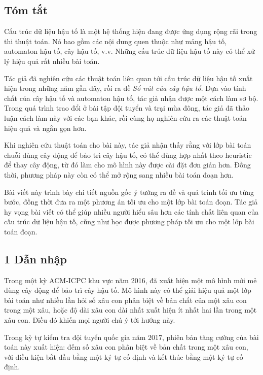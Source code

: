 \documentclass[11pt]{article}
\begin{document}
\subsection*{Tóm tắt}

Cấu trúc dữ liệu hậu tố là một hệ thống hiện đang được ứng dụng rộng rãi trong
thi thuật toán. Nó bao gồm các nội dung quen thuộc như mảng hậu tố, automaton
hậu tố, cây hậu tố, v.v. Những cấu trúc dữ liệu hậu tố này có thể xử lý hiệu quả
rất nhiều bài toán.

Tác giả đã nghiên cứu các thuật toán liên quan tới cấu trúc dữ liệu hậu tố xuất
hiện trong những năm gần đây, rồi ra đề \emph{Số nút của cây hậu tố}. Dựa vào
tính chất của cây hậu tố và automaton hậu tố, tác giả nhận được một cách làm
sơ bộ. Trong quá trình trao đổi ở bài tập đội tuyển và trại mùa đông, tác giả
đã thảo luận cách làm này với các bạn khác, rồi cùng họ nghiên cứu ra các thuật
toán hiệu quả và ngắn gọn hơn.

Khi nghiên cứu thuật toán cho bài này, tác giả nhận thấy rằng với lớp bài toán
chuỗi dùng cây động để bảo trì cây hậu tố, có thể dùng hợp nhất theo heuristic
để thay cây động, từ đó làm cho mô hình này được cài đặt đơn giản hơn. Đồng
thời, phương pháp này còn có thể mở rộng sang nhiều bài toán đoạn hơn.

Bài viết này trình bày chi tiết nguồn gốc ý tưởng ra đề và quá trình tối ưu
từng bước, đồng thời đưa ra một phương án tối ưu cho một lớp bài toán đoạn. Tác
giả hy vọng bài viết có thể giúp nhiều người hiểu sâu hơn các tính chất liên
quan của cấu trúc dữ liệu hậu tố, cũng như học được phương pháp tối ưu cho một
lớp bài toán đoạn.

\subsection*{1 Dẫn nhập}

Trong một kỳ ACM-ICPC khu vực năm 2016, đã xuất hiện một mô hình mới mẻ dùng
cây động để bảo trì cây hậu tố. Mô hình này có thể giải hiệu quả một lớp bài
toán như nhiều lần hỏi số xâu con phân biệt về bản chất của một xâu con trong
một xâu, hoặc độ dài xâu con dài nhất xuất hiện ít nhất hai lần trong một xâu
con. Điều đó khiến mọi người chú ý tới hướng này.

Trong kỳ tự kiểm tra đội tuyển quốc gia năm 2017, phiên bản tăng cường của bài
toán này xuất hiện: đếm số xâu con phân biệt về bản chất trong một xâu con, với
điều kiện bắt đầu bằng một ký tự cố định và kết thúc bằng một ký tự cố định.
\end{document}
